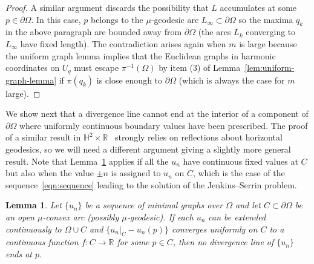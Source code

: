 \documentclass[a4paper,10pt,reqno]{amsart}
\newcommand{\R}{\mathbb{R}}
\newtheorem{lemma}[theorem]{Lemma}
\theoremstyle{definition}
\theoremstyle{remark}
\numberwithin{equation}{section}
\begin{document}
\begin{proof}
A similar argument discards the possibility that $L$ accumulates at some $p\in\partial\Omega$. In this case, $p$ belongs to the $\mu$-geodesic arc $L_\infty\subset\partial\Omega$ so the maxima $q_k$ in the above paragraph are bounded away from $\partial\Omega$  (the arcs $L_k$ converging to $L_\infty$ have fixed length). The contradiction arises again when $m$ is large because the uniform graph lemma implies that the Euclidean graphs in harmonic coordinates on $U_q$ must escape $\pi^{-1}(\Omega)$ by item (3) of Lemma~\ref{lem:uniform-graph-lemma} if $\pi(q_k)$ is close enough to $\partial\Omega$ (which is always the case for $m$ large).
\end{proof}

We show next that a divergence line cannot end at the interior of a component of $\partial\Omega$ where uniformly continuous boundary values have been prescribed. The proof of a similar result in $\mathbb{H}^2\times\mathbb{R}$~\cite[Prop.~4.8]{MRR} strongly relies on reflections about horizontal geodesics, so we will need a different argument giving a slightly more general result. Note that Lemma~\ref{lem:divline-boundary-values} applies if all the $u_n$ have continuous fixed values at $C$ but also when the value $\pm n$ is assigned to $u_n$ on $C$, which is the case of the sequence~\eqref{eqn:sequence} leading to the solution of the Jenkins--Serrin problem.

\begin{lemma}\label{lem:divline-boundary-values}
Let $\{u_n\}$ be a sequence of minimal graphs over $\Omega$ and let $C\subset\partial\Omega$ be an open $\mu$-convex arc (possibly $\mu$-geodesic). If each $u_n$ can be extended continuously to $\Omega\cup C$ and $\{u_n|_C-u_n(p)\}$ converges uniformly on $C$ to a continuous function $f:C\to\R$ for some $p\in C$, then no divergence line of $\{u_n\}$ ends at $p$.  
\end{lemma}
\end{document}
